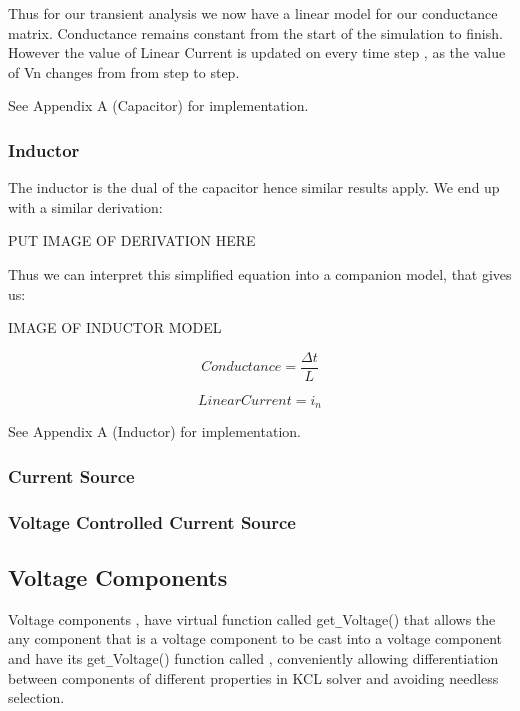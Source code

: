\documentclass{article}
\begin{document}
Thus for our transient analysis we now have a linear model for our conductance matrix. Conductance remains constant from the start of the simulation to finish. However the value of Linear Current is updated on every time step , as the value of Vn changes from from step to step.

\bigbreak 

See Appendix A (Capacitor) for implementation.

\newpage

\subsubsection{Inductor}
The inductor is the dual of the capacitor hence similar results apply. We end up with a similar derivation:
\bigbreak

PUT IMAGE OF DERIVATION HERE

\bigbreak

Thus we can interpret this simplified equation into a companion model, that gives us: 

\bigbreak

IMAGE OF INDUCTOR MODEL 

\bigbreak


\noindent\begin{minipage}{.4\linewidth}
\setcounter{equation}{0}
\begin{equation}
  Conductance = \frac{\Delta t}{L}
\end{equation}
\end{minipage}%
\begin{minipage}{.7\linewidth}
\begin{equation}
  LinearCurrent = i_n
\end{equation}
\end{minipage}

\bigbreak


See Appendix A (Inductor) for implementation.

\newpage

\subsubsection{Current Source}
\subsubsection{Voltage Controlled Current Source}

\subsection{Voltage Components}
Voltage components , have virtual function called get\verb|_|Voltage() that allows the any component that is a voltage component to be cast into a voltage component and have its get\verb|_|Voltage() function called , conveniently allowing differentiation between components of different properties in KCL solver and avoiding needless selection.
\medbreak
\end{document}
